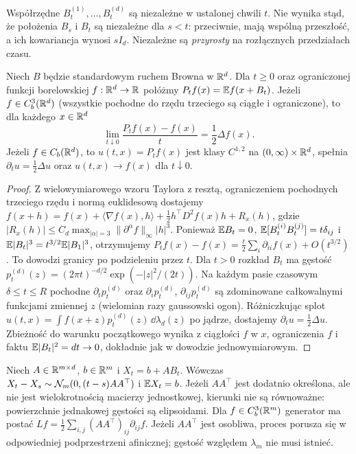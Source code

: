 \begin{uwaga}
Współrzędne $B_t^{(1)},\ldots,B_t^{(d)}$ są niezależne w ustalonej
chwili $t$. Nie wynika stąd, że położenia $B_s$ i $B_t$ są niezależne
dla $s<t$: przeciwnie, mają wspólną przeszłość, a ich kowariancja
wynosi $sI_d$. Niezależne są \emph{przyrosty} na rozłącznych
przedziałach czasu.
\end{uwaga}

\begin{twierdzenie}
Niech $B$ będzie standardowym ruchem Browna w $\mathbb{R}^d$.
Dla $t\ge0$ oraz ograniczonej funkcji borelowskiej
$f:\mathbb{R}^d\to\mathbb{R}$ połóżmy $P_tf(x)=\mathbb{E} f(x+B_t)$.
Jeżeli $f\in C_b^3(\mathbb{R}^d)$ (wszystkie pochodne do rzędu trzeciego
są ciągłe i ograniczone), to dla każdego $x\in\mathbb{R}^d$
\[
\lim_{t\downarrow0}\frac{P_tf(x)-f(x)}{t}=\frac12\Delta f(x).
\]
Jeżeli $f\in C_b(\mathbb{R}^d)$, to $u(t,x)=P_tf(x)$ jest klasy
$C^{1,2}$ na $(0,\infty)\times\mathbb{R}^d$, spełnia
$\partial_tu=\frac12\Delta u$ oraz $u(t,x)\to f(x)$ dla $t\downarrow0$.
\end{twierdzenie}
\begin{proof}
Z wielowymiarowego wzoru Taylora z resztą, ograniczeniem
pochodnych trzeciego rzędu i normą euklidesową dostajemy
$f(x+h)=f(x)+\langle\nabla f(x),h\rangle+
\frac12 h^\top D^2f(x)h+R_x(h)$, gdzie
$|R_x(h)|\le C_d\max_{|\alpha|=3}\|\partial^\alpha f\|_\infty|h|^3$.
Ponieważ $\mathbb{E} B_t=0$,
$\mathbb{E}[B_t^{(i)}B_t^{(j)}]=t\delta_{ij}$ i
$\mathbb{E}|B_t|^3=t^{3/2}\mathbb{E}|B_1|^3$, otrzymujemy
$P_tf(x)-f(x)=\frac{t}{2}\sum_i\partial_{ii}f(x)+O(t^{3/2})$.
To dowodzi granicy po podzieleniu przez $t$.
Dla $t>0$ rozkład $B_t$ ma gęstość
$p_t^{(d)}(z)=(2\pi t)^{-d/2}\exp(-|z|^2/(2t))$.
Na każdym pasie czasowym $\delta\le t\le R$ pochodne
$\partial_t p_t^{(d)}$ oraz $\partial_i p_t^{(d)}$,
$\partial_{ij}p_t^{(d)}$ są zdominowane całkowalnymi
funkcjami zmiennej $z$ (wielomian razy gaussowski ogon).
Różniczkując splot $u(t,x)=\int f(x+z)p_t^{(d)}(z)\,\dd\lambda_d(z)$
po jądrze, dostajemy $\partial_tu=\frac12\Delta u$.
Zbieżność do warunku początkowego wynika z ciągłości $f$ w $x$,
ograniczenia $f$ i faktu $\mathbb{E}|B_t|^2=dt\to0$, dokładnie jak
w dowodzie jednowymiarowym.
\end{proof}

\begin{przyklad}
Niech $A\in\mathbb{R}^{m\times d}$, $b\in\mathbb{R}^m$ i $X_t=b+AB_t$.
Wówczas $X_t-X_s\sim\mathcal{N}_m(0,(t-s)AA^\top)$ i
$\mathbb{E} X_t=b$. Jeżeli $AA^\top$ jest dodatnio określona, ale nie jest wielokrotnością
macierzy jednostkowej, kierunki nie są równoważne: powierzchnie
jednakowej gęstości są elipsoidami. Dla
$f\in C_b^3(\mathbb{R}^m)$ generator ma postać
$Lf=\frac12\sum_{i,j}(AA^\top)_{ij}\partial_{ij}f$.
Jeżeli $AA^\top$ jest osobliwa, proces porusza się w
odpowiedniej podprzestrzeni afinicznej; gęstość względem
$\lambda_m$ nie musi istnieć.
\end{przyklad}


